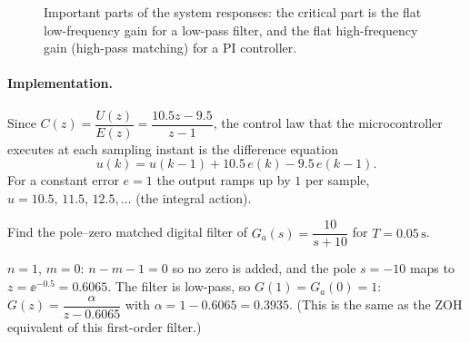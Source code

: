\begin{figure}[ht]
\centering
\resizebox{0.98\linewidth}{!}{\figMagSketches}
\caption{Important parts of the system responses: the critical part is the flat low-frequency gain for a
low-pass filter, and the flat high-frequency gain (high-pass matching) for a PI controller.}
\end{figure}

\paragraph{Implementation.} Since $C(z)=\dfrac{U(z)}{E(z)}=\dfrac{10.5z-9.5}{z-1}$, the control law that the
microcontroller executes at each sampling instant is the difference equation
\[
  u(k)=u(k-1)+10.5\,e(k)-9.5\,e(k-1).
\]
For a constant error $e=1$ the output ramps up by $1$ per sample, $u=10.5,\,11.5,\,12.5,\dots$ (the integral action).

\begin{problem}
Find the pole--zero matched digital filter of $G_a(s)=\dfrac{10}{s+10}$ for $T=0.05\,\mathrm{s}$.
\end{problem}
\begin{solution}
$n=1$, $m=0$: $n-m-1=0$ so no zero is added, and the pole $s=-10$ maps to $z=\ee^{-0.5}=0.6065$. The filter is low-pass,
so $G(1)=G_a(0)=1$: $G(z)=\dfrac{\alpha}{z-0.6065}$ with $\alpha=1-0.6065=0.3935$. (This is the same as the ZOH
equivalent of this first-order filter.)
\end{solution}

